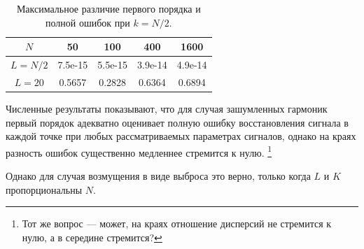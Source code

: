 \documentclass[specialist,
               substylefile = spbu.rtx,
               subf,href,colorlinks=true, 12pt]{disser}
\begin{document}
\begin{table}[H]
	\begin{center}
		\caption{Максимальное различие первого порядка и полной ошибок при $k = N / 2$.}
		\label{tab:const_outl_2}
		\begin{tabular}{|c|c|c|c|c|}
			\hline
			$N$	& 50 & 100 & 400 & 1600 \\
			\hline
			$L = N / 2$ & 7.5e-15  & 5.5e-15  & 3.9e-14 & 4.9e-14 \\
			\hline
			$L = 20$ & 0.5657  & 0.2828  & 0.6364 & 0.6894 \\
			\hline
		\end{tabular}
	\end{center}
\end{table}

Численные результаты показывают, что для случая зашумленных гармоник первый порядок адекватно оценивает полную ошибку восстановления сигнала в каждой точке при любых рассматриваемых параметрах сигналов, однако на краях разность ошибок существенно медленнее стремится к нулю.
\footnote{Тот же вопрос --- может, на краях отношение дисперсий не стремится к нулю, а в середине стремится?}

Однако для случая возмущения в виде выброса это верно, только когда $L$ и $K$ пропорциональны $N$.
\end{document}
